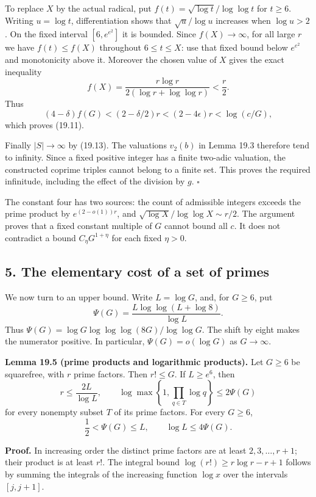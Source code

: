 \documentclass[
  11pt,
  a4paper,
]{article}
\begin{document}
To replace \(X\) by the actual radical, put
\(f(t)=\sqrt{\log t}/\log\log t\) for \(t\ge6\). Writing \(u=\log t\),
differentiation shows that \(\sqrt u/\log u\) increases when
\(\log u>2\). On the fixed interval \([6,e^{e^2}]\) it is bounded. Since
\(f(X)\to\infty\), for all large \(r\) we have \(f(t)\le f(X)\)
throughout \(6\le t\le X\): use that fixed bound below \(e^{e^2}\) and
monotonicity above it. Moreover the chosen value of \(X\) gives the
exact inequality \[
 f(X)=\frac{r\log r}{2(\log r+\log\log r)}<\frac r2.
 \tag{19.15}
\] Thus \[
 (4-\delta)f(G)<(2-\delta/2)r
       <(2-4\epsilon)r<\log(c/G),
\] which proves (19.11).

Finally \(|S|\to\infty\) by (19.13). The valuations \(v_2(b)\) in Lemma
19.3 therefore tend to infinity. Since a fixed positive integer has a
finite two-adic valuation, the constructed coprime triples cannot belong
to a finite set. This proves the required infinitude, including the
effect of the division by \(g\). \(\square\)

The constant four has two sources: the count of admissible integers
exceeds the prime product by \(e^{(2-o(1))r}\), and
\(\sqrt{\log X}/\log\log X\sim r/2\). The argument proves that a fixed
constant multiple of \(G\) cannot bound all \(c\). It does not
contradict a bound \(C_\eta G^{1+\eta}\) for each fixed \(\eta>0\).

\subsection{5. The elementary cost of a set of
primes}\label{the-elementary-cost-of-a-set-of-primes}

We now turn to an upper bound. Write \(L=\log G\), and, for \(G\ge6\),
put \[
 \Psi(G)=\frac{L\log\log(L+\log8)}{\log L}.
 \tag{19.16}
\] Thus \(\Psi(G)=\log G\log\log\log(8G)/\log\log G\). The shift by
eight makes the numerator positive. In particular, \(\Psi(G)=o(\log G)\)
as \(G\to\infty\).

\textbf{Lemma 19.5 (prime products and logarithmic products).} Let
\(G\ge6\) be squarefree, with \(r\) prime factors. Then \(r!\le G\). If
\(L\ge e^6\), then \[
 r\le\frac{2L}{\log L},\qquad
 \log\max\left\{1,\prod_{q\in T}\log q\right\}
       \le2\Psi(G)
 \tag{19.17}
\] for every nonempty subset \(T\) of its prime factors. For every
\(G\ge6\), \[
 \frac12<\Psi(G)\le L,\qquad \log L\le4\Psi(G).
 \tag{19.18}
\]

\textbf{Proof.} In increasing order the distinct prime factors are at
least \(2,3,\ldots,r+1\); their product is at least \(r!\). The integral
bound \(\log(r!)\ge r\log r-r+1\) follows by summing the integrals of
the increasing function \(\log x\) over the intervals \([j,j+1]\).
\end{document}
